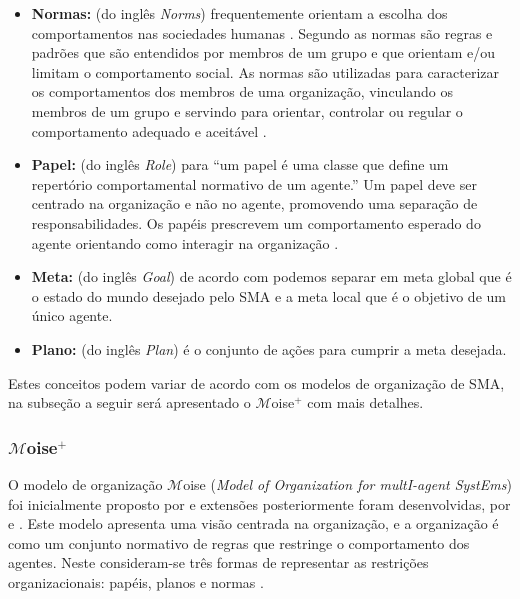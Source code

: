 \begin{itemize}

\item \textbf{Normas:} (do inglês \textit{Norms}) frequentemente orientam a escolha dos comportamentos nas sociedades humanas \cite{sen2007emergence}. Segundo \citet{cialdini1998social} as normas são regras e padrões que são entendidos por membros de um grupo e que orientam e/ou limitam o comportamento social. As normas são utilizadas para caracterizar os comportamentos dos membros de uma organização, vinculando os membros de um grupo e servindo para orientar, controlar ou regular o comportamento adequado e aceitável \cite{jennings2000agent}.

\item \textbf{Papel:} (do inglês \textit{Role}) para \citet{odell2002role} “um papel é uma classe que define um repertório comportamental normativo de um agente.” Um papel deve ser centrado na organização e não no agente, promovendo uma separação de responsabilidades. Os papéis prescrevem um comportamento esperado do agente orientando como interagir na organização \cite{tinnemeier2009roles}.

\item \textbf{Meta:} (do inglês \textit{Goal}) de acordo com \cite{hubner2003modelo} podemos separar em meta global que é o estado do mundo desejado pelo SMA e a meta local que é o objetivo de um único agente.

\item \textbf{Plano:} (do inglês \textit{Plan}) é o conjunto de ações para cumprir a meta desejada.
\end{itemize}

Estes conceitos podem variar de acordo com os modelos de organização de SMA, na subseção a seguir será apresentado o $\mathcal{M}$oise$^{+}$ com mais detalhes.

\subsubsection{$\mathcal{M}$oise$^{+}$}

O modelo de organização $\mathcal{M}$oise (\textit{Model of Organization for multI-agent SystEms}) foi inicialmente proposto por \cite{hannoun2000moise} e extensões posteriormente foram desenvolvidas, por \cite{hubner2003modelo} e \cite{hubner2005mathcal}. Este modelo apresenta uma visão centrada na organização, e a organização é como um conjunto normativo de regras que restringe o comportamento dos agentes. Neste consideram-se três formas de representar as restrições organizacionais: papéis, planos e normas \cite{hannoun2000moise}.

